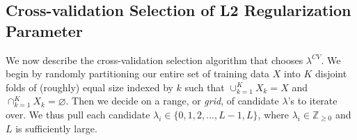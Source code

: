 \documentclass[12pt]{article}
\begin{document}
\subsection{Cross-validation Selection of L2 Regularization Parameter}

We now describe the cross-validation selection algorithm that chooses $\lambda^{CV}$. We begin by randomly partitioning our entire set of training data $X$ into $K$ disjoint folds of (roughly) equal size indexed by $k$ such that $\cup_{k=1}^{K} X_{k} = X$ and $\cap_{k=1}^{K} X_{k} = \varnothing$. Then we decide on a range, or \textit{grid}, of candidate $\lambda$'s to iterate over. We thus pull each candidate $\lambda_i \in \{0, 1, 2, \dots, L-1, L\}$, where $\lambda_i \in \mathbb{Z}_{\geq 0}$ and $L$ is sufficiently large.\\
\end{document}
